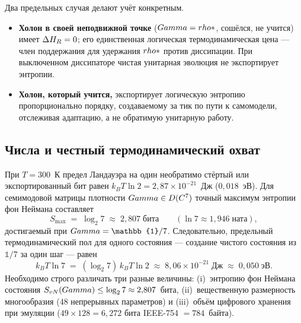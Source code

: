 Два предельных случая делают учёт конкретным.
\begin{itemize}[leftmargin=1.5em,itemsep=1pt]
  \item \textbf{Холон в своей неподвижной точке} ($Gamma=rho*$, сошёлся, не
        учится) имеет $\Delta H_{R}=0$; его единственная логическая
        термодинамическая цена --- член поддержания для удержания $rho*$
        против диссипации. При выключенном диссипаторе чистая унитарная
        эволюция не экспортирует энтропии.
  \item \textbf{Холон, который учится,} экспортирует логическую энтропию
        пропорционально порядку, создаваемому за тик по пути к самомодели,
        отслеживая адаптацию, а не обратимую унитарную работу.
\end{itemize}

\subsection{Числа и честный термодинамический охват}

При $T=300$~К предел Ландауэра на один необратимо стёртый или экспортированный
бит равен $k_B T\ln 2 = 2{,}87\times10^{-21}$~Дж ($0{,}018$~эВ). Для
семимодовой матрицы плотности $Gamma\in D(C^7)$ точный максимум
энтропии фон Неймана составляет
\begin{equation*}
S_{\max} \;=\; \log_2 7 \;\approx\; 2{,}807\;\text{бита}
\qquad (\ln 7 \approx 1{,}946\;\text{ната}),
\end{equation*}
достигаемый при $\Gam=\mathbb{1}/7$. Следовательно, предельный термодинамический
пол для одного состояния --- создание чистого состояния из $\mathbb{1}/7$ за
один шаг --- равен
\[
k_B T\ln 7 \;=\; (\log_2 7)\,k_B T\ln 2 \;\approx\; 8{,}06\times10^{-21}\;\text{Дж}
\;\approx\; 0{,}050\;\text{эВ}.
\]
Необходимо строго различать три разные величины: (i)~энтропию фон Неймана
состояния $S_{vN}(Gamma)\le\log_2 7\approx 2{,}807$~бита,
(ii)~вещественную размерность многообразия ($48$ непрерывных параметров) и
(iii)~объём цифрового хранения при эмуляции ($49\times 128 = 6{,}272$ бита
IEEE-754 $= 784$~байта).

